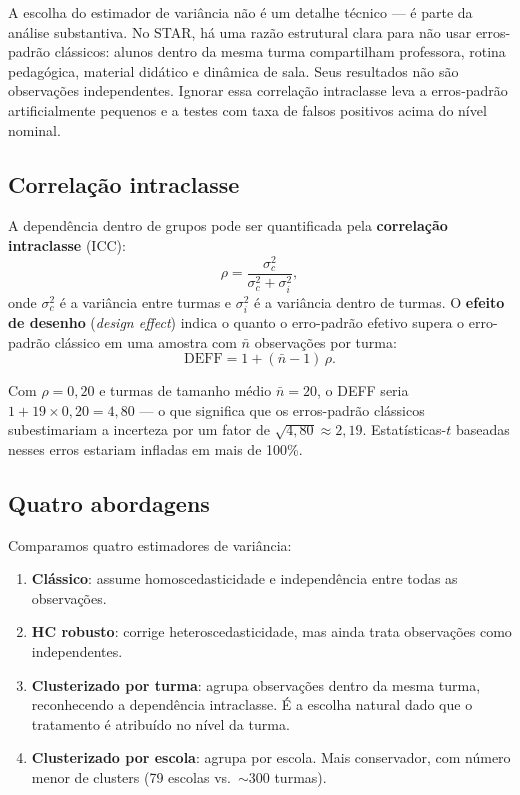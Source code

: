 A escolha do estimador de variância não é um detalhe técnico --- é parte da análise substantiva. No STAR, há uma razão estrutural clara para não usar erros-padrão clássicos: alunos dentro da mesma turma compartilham professora, rotina pedagógica, material didático e dinâmica de sala. Seus resultados não são observações independentes. Ignorar essa correlação intraclasse leva a erros-padrão artificialmente pequenos e a testes com taxa de falsos positivos acima do nível nominal.

\subsection*{Correlação intraclasse}

A dependência dentro de grupos pode ser quantificada pela \textbf{correlação intraclasse} (ICC):
\begin{equation}
  \rho = \frac{\sigma^2_c}{\sigma^2_c + \sigma^2_i},
  \label{eq:icc}
\end{equation}
onde $\sigma^2_c$ é a variância entre turmas e $\sigma^2_i$ é a variância dentro de turmas. O \textbf{efeito de desenho} (\textit{design effect}) indica o quanto o erro-padrão efetivo supera o erro-padrão clássico em uma amostra com $\bar{n}$ observações por turma:
\begin{equation}
  \text{DEFF} = 1 + (\bar{n} - 1)\,\rho.
  \label{eq:deff}
\end{equation}

Com $\rho = 0{,}20$ e turmas de tamanho médio $\bar{n} = 20$, o DEFF seria $1 + 19 \times 0{,}20 = 4{,}80$ --- o que significa que os erros-padrão clássicos subestimariam a incerteza por um fator de $\sqrt{4{,}80} \approx 2{,}19$. Estatísticas-$t$ baseadas nesses erros estariam infladas em mais de 100\%.

\subsection*{Quatro abordagens}

Comparamos quatro estimadores de variância:

\begin{enumerate}[leftmargin=*, label=(\roman*)]
  \item \textbf{Clássico}: assume homoscedasticidade e independência entre todas as observações.
  \item \textbf{HC robusto}: corrige heteroscedasticidade, mas ainda trata observações como independentes.
  \item \textbf{Clusterizado por turma}: agrupa observações dentro da mesma turma, reconhecendo a dependência intraclasse. É a escolha natural dado que o tratamento é atribuído no nível da turma.
  \item \textbf{Clusterizado por escola}: agrupa por escola. Mais conservador, com número menor de clusters (79 escolas vs.\ $\sim$300 turmas).
\end{enumerate}

